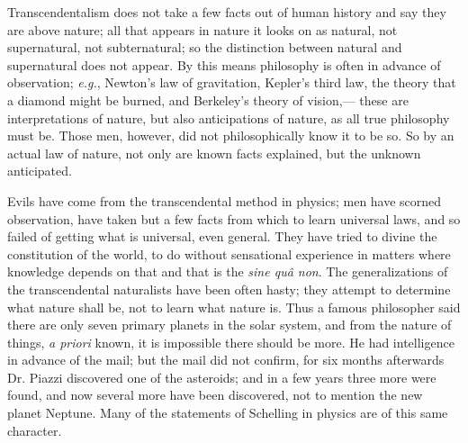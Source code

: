 \documentclass[12pt]{article}
\begin{document}
Transcendentalism does not take a few facts out of human history and say they are above nature; all that appears in nature it looks on as natural, not supernatural, not subternatural; so the distinction between natural and supernatural does not appear. By this means philosophy is often in advance of observation; \emph{e.g.}, Newton's law of gravitation, Kepler's third law, the theory that a diamond might be burned, and Berkeley's theory of vision,--- these are interpretations of nature, but also anticipations of nature, as all true philosophy must be. Those men, however, did not philosophically know it to be so. So by an actual law of nature, not only are known facts explained, but the unknown anticipated. 

Evils have come from the transcendental method in physics; men have scorn\-ed observation, have taken but a few facts from which to learn universal laws, and so failed of getting what is universal, even general. They have tried to divine the constitution of the world, to do without sensational experience in matters where knowledge depends on that and that is the \emph{sine qu\^{a} non}. The generalizations of the transcendental naturalists have been often hasty; they attempt to determine what nature shall be, not to learn what nature is. Thus a famous philosopher said there are only seven primary planets in the solar system, and from the nature of things, \emph{a priori} known, it is impossible there should be more. He had intelligence in advance of the mail; but the mail did not confirm, for six months afterwards Dr. Piazzi discovered one of the asteroids; and in a few years three more were found, and now several more have been discovered, not to mention the new planet Neptune. Many of the statements of Schelling in physics are of this same character. 
\end{document}
